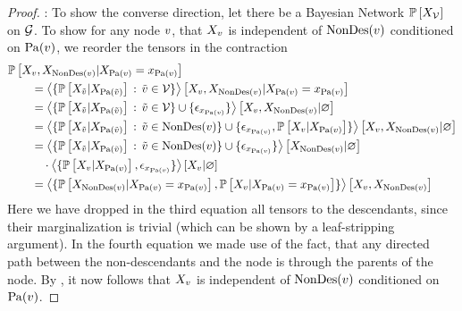\begin{proof}
    \proofleftsymbol:
    To show the converse direction, let there be a Bayesian Network $\mathbb{P}\left[X_{\mathcal{V}}\right]$ on $\mathcal{G}$.
    To show for any node $v$, that $X_{v}$ is independent of $\mathrm{NonDes}(v)$ conditioned on $\mathrm{Pa}(v)$, we reorder the tensors in the contraction
    \begin{align*}
        & \condprobof{\catvariableof{\node},\catvariableof{\nondescendantsof{\node}}}{\indexedcatvariableof{\parentsof{\node}}} \\
        & \quad\quad = \normalizationofwrt{
            \{\condprobof{\catvariableof{\secnode}}{\catvariableof{\parentsof{\secnode}}} \wcols\secnode\in\nodes\}
        }
        {\catvariableof{\node},\catvariableof{\nondescendantsof{\node}}}
        {\indexedcatvariableof{\parentsof{\node}}} \\
        & \quad\quad  = \normalizationof{
            \{\condprobof{\catvariableof{\secnode}}{\catvariableof{\parentsof{\secnode}}} \wcols\secnode\in\nodes\} \cup \{\onehotmapof{\catindexof{\parentsof{\node}}}\}
        }
        {\catvariableof{\node},\catvariableof{\nondescendantsof{\node}}}\\
        &  \quad\quad = \normalizationof{
            \{\condprobof{\catvariableof{\secnode}}{\catvariableof{\parentsof{\secnode}}} \wcols\secnode\in\nondescendantsof{\node}\} \cup \{\onehotmapof{\catindexof{\parentsof{\node}}}, \condprobof{\catvariableof{\node}}{\catvariableof{\parentsof{\node}}} \}
        }
        {\catvariableof{\node},\catvariableof{\nondescendantsof{\node}}} \\
        &  \quad\quad =  %
        \normalizationof{
            \{\condprobof{\catvariableof{\secnode}}{\catvariableof{\parentsof{\secnode}}} \wcols\secnode\in\nondescendantsof{\node}\} \cup \{\onehotmapof{\catindexof{\parentsof{\node}}}\}
        }
        {\catvariableof{\nondescendantsof{\node}}} \\
        & \quad\quad  \quad  \cdot \normalizationof{
            \{\condprobof{\catvariableof{\node}}{\catvariableof{\parentsof{\node}}},\onehotmapof{\catindexof{\parentsof{\node}}}\}
        }
        {\catvariableof{\node}} \\
        & \quad\quad  = \contractionof{\{
        \condprobof{\catvariableof{\nondescendantsof{\node}}}{\indexedcatvariableof{\parentsof{\node}}},
            \condprobof{\catvariableof{\node}}{\indexedcatvariableof{\parentsof{\node}}}
            \}}{\catvariableof{\node},\catvariableof{\nondescendantsof{\node}}}
    \end{align*}
    Here we have dropped in the third equation all tensors to the descendants, since their marginalization is trivial (which can be shown by a leaf-stripping argument).
    In the fourth equation we made use of the fact, that any directed path between the non-descendants and the node is through the parents of the node.
    By , it now follows that $X_{v}$ is independent of $\mathrm{NonDes}(v)$ conditioned on $\mathrm{Pa}(v)$.
\end{proof}

